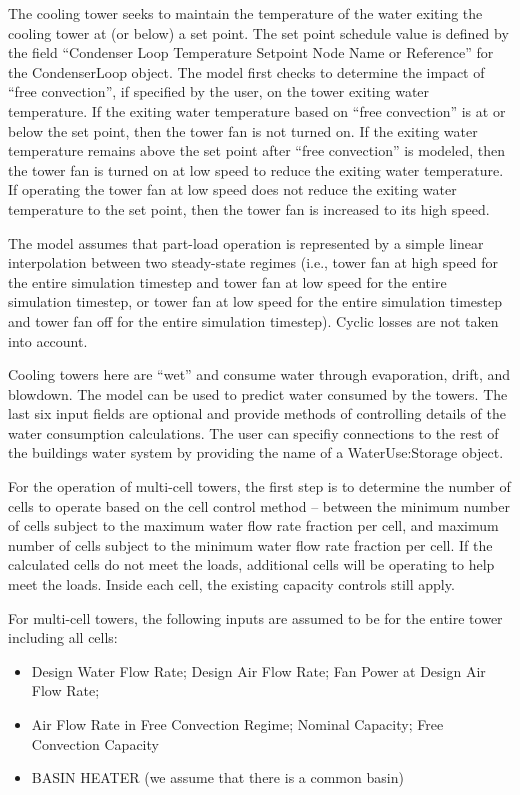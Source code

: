 The cooling tower seeks to maintain the temperature of the water exiting the cooling tower at (or below) a set point. The set point schedule value is defined by the field ``Condenser Loop Temperature Setpoint Node Name or Reference'' for the CondenserLoop object. The model first checks to determine the impact of ``free convection'', if specified by the user, on the tower exiting water temperature. If the exiting water temperature based on ``free convection'' is at or below the set point, then the tower fan is not turned on. If the exiting water temperature remains above the set point after ``free convection'' is modeled, then the tower fan is turned on at low speed to reduce the exiting water temperature. If operating the tower fan at low speed does not reduce the exiting water temperature to the set point, then the tower fan is increased to its high speed.

The model assumes that part-load operation is represented by a simple linear interpolation between two steady-state regimes (i.e., tower fan at high speed for the entire simulation timestep and tower fan at low speed for the entire simulation timestep, or tower fan at low speed for the entire simulation timestep and tower fan off for the entire simulation timestep). Cyclic losses are not taken into account.

Cooling towers here are ``wet'' and consume water through evaporation, drift, and blowdown. The model can be used to predict water consumed by the towers. The last six input fields are optional and provide methods of controlling details of the water consumption calculations. The user can specifiy connections to the rest of the buildings water system by providing the name of a WaterUse:Storage object.

For the operation of multi-cell towers, the first step is to determine the number of cells to operate based on the cell control method -- between the minimum number of cells subject to the maximum water flow rate fraction per cell, and maximum number of cells subject to the minimum water flow rate fraction per cell. If the calculated cells do not meet the loads, additional cells will be operating to help meet the loads. Inside each cell, the existing capacity controls still apply.

For multi-cell towers, the following inputs are assumed to be for the entire tower including all cells:

\begin{itemize}
\item
  Design Water Flow Rate; Design Air Flow Rate; Fan Power at Design Air Flow Rate;
\item
  Air Flow Rate in Free Convection Regime; Nominal Capacity; Free Convection Capacity
\item
  BASIN HEATER (we assume that there is a common basin)
\end{itemize}

